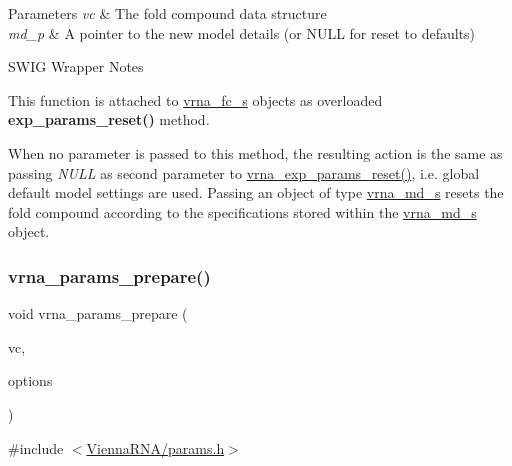 \begin{DoxyParams}{Parameters}
{\em vc} & The fold compound data structure \\
\hline
{\em md\+\_\+p} & A pointer to the new model details (or N\+U\+LL for reset to defaults)\\
\hline
\end{DoxyParams}
\begin{DoxyRefDesc}{S\+W\+I\+G Wrapper Notes}
\item[\mbox{\hyperlink{wrappers__wrappers000082}{S\+W\+I\+G Wrapper Notes}}]This function is attached to \mbox{\hyperlink{group__fold__compound_structvrna__fc__s}{vrna\+\_\+fc\+\_\+s}} objects as overloaded {\bfseries exp\+\_\+params\+\_\+reset()} method.

When no parameter is passed to this method, the resulting action is the same as passing {\itshape N\+U\+LL} as second parameter to \mbox{\hyperlink{group__energy__parameters_gaa5409218068be84d7b50c78fbdaa85a9}{vrna\+\_\+exp\+\_\+params\+\_\+reset()}}, i.\+e. global default model settings are used. Passing an object of type \mbox{\hyperlink{group__model__details_structvrna__md__s}{vrna\+\_\+md\+\_\+s}} resets the fold compound according to the specifications stored within the \mbox{\hyperlink{group__model__details_structvrna__md__s}{vrna\+\_\+md\+\_\+s}} object. \end{DoxyRefDesc}
\mbox{\label{group__energy__parameters_ga881878603a5668e49316d0cd1a10580a}} 
\subsubsection{\texorpdfstring{vrna\+\_\+params\+\_\+prepare()}{vrna\_params\_prepare()}}
{\footnotesize\ttfamily void vrna\+\_\+params\+\_\+prepare (\begin{DoxyParamCaption}\item[{\mbox{\hyperlink{group__fold__compound_ga1b0cef17fd40466cef5968eaeeff6166}{vrna\+\_\+fold\+\_\+compound\+\_\+t}} $\ast$}]{vc,  }\item[{unsigned int}]{options }\end{DoxyParamCaption})}



{\ttfamily \#include $<$\mbox{\hyperlink{params_8h}{Vienna\+R\+N\+A/params.\+h}}$>$}

